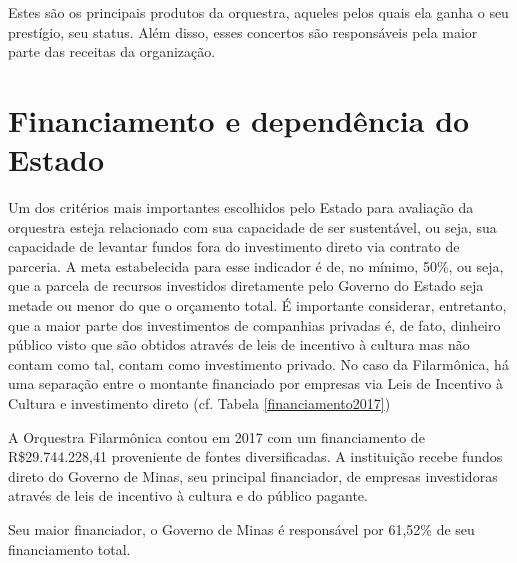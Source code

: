 \documentclass[a4paper, 12pt, openright, oneside, german, french, english, brazil]{abntex2}
\begin{document}
	
	Estes são os principais produtos da orquestra, aqueles pelos quais ela ganha o seu prestígio, seu status. Além disso, esses concertos são responsáveis pela maior parte das receitas da organização.
	
	
	
	\section{Financiamento e dependência do Estado}
	
	
	Um dos critérios mais importantes escolhidos pelo Estado para avaliação da orquestra esteja relacionado com sua capacidade de ser sustentável, ou seja, sua capacidade de levantar fundos fora do investimento direto via contrato de parceria. A meta estabelecida para esse indicador é de, no mínimo, 50\%, ou seja, que a parcela de recursos investidos diretamente pelo Governo do Estado seja metade ou menor do que o orçamento total. É importante considerar, entretanto, que a maior parte dos investimentos de companhias privadas é, de fato, dinheiro público visto que são obtidos através de leis de incentivo à cultura mas não contam como tal, contam como investimento privado. No caso da Filarmônica, há uma separação entre o montante financiado por empresas via Leis de Incentivo à Cultura e investimento direto (cf. Tabela \ref{financiamento2017})
	
	A Orquestra Filarmônica contou em 2017 com um financiamento de R\$29.744.228,41 \cite{minas2017aditivo} proveniente de fontes diversificadas. A instituição recebe fundos direto do Governo de Minas, seu principal financiador, de empresas investidoras através de leis de incentivo à cultura e do público pagante.
	
	
	Seu maior financiador, o Governo de Minas é responsável por 61,52\% de seu financiamento total.
	
\end{document}
